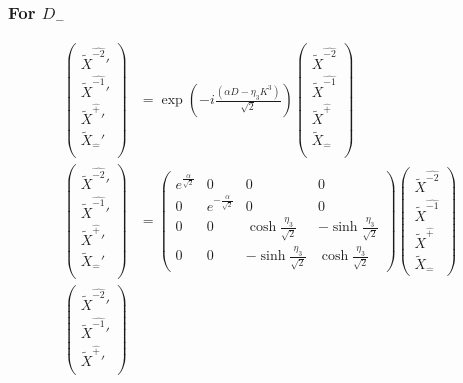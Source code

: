 \documentclass[]{article}
\numberwithin{equation}{section}
\begin{document}
{{\subsubsection{For $D_{-}$}
\begin{align}
\begin{pmatrix}
    \tilde{X}^{\hat{-2}}'\\
    \tilde{X}^{\hat{-1}}'\\
    \tilde{X}^{\hat{+}}'\\
    \tilde{X}_{\hat{-}}'\\
    \end{pmatrix}&= \exp{\left(-i\frac{(\alpha D-\eta_{3}K^{3})}{\sqrt{2}}\right)}\begin{pmatrix}
    \tilde{X}^{\hat{-2}}\\
    \tilde{X}^{\hat{-1}}\\
    \tilde{X}^{\hat{+}}\\
    \tilde{X}_{\hat{-}}\\
    \end{pmatrix}\\
    \begin{pmatrix}
    \tilde{X}^{\hat{-2}}'\\
    \tilde{X}^{\hat{-1}}'\\
    \tilde{X}^{\hat{+}}'\\
    \tilde{X}_{\hat{-}}'\\
    \end{pmatrix}&= \begin{pmatrix}
        e^{\frac{\alpha}{\sqrt{2}}}&0&0&0\\
        0&e^{-\frac{\alpha}{\sqrt{2}}}&0&0\\
        0&0&\cosh{\frac{\eta_{3}}{\sqrt{2}}}&-\sinh{\frac{\eta_{3}}{\sqrt{2}}}\\
        0&0&-\sinh{\frac{\eta_{3}}{\sqrt{2}}}&\cosh{\frac{\eta_{3}}{\sqrt{2}}}
    \end{pmatrix}\begin{pmatrix}
    \tilde{X}^{\hat{-2}}\\
    \tilde{X}^{\hat{-1}}\\
    \tilde{X}^{\hat{+}}\\
    \tilde{X}_{\hat{-}}
    \end{pmatrix}\\
    \begin{pmatrix}
    \tilde{X}^{\hat{-2}}'\\
    \tilde{X}^{\hat{-1}}'\\
    \tilde{X}^{\hat{+}}'\\

\end{pmatrix}
\end{align}}}
\end{document}
